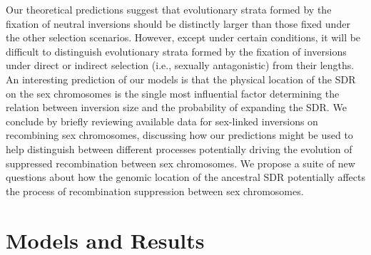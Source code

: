 \documentclass{article}
\begin{document}
Our theoretical predictions suggest that evolutionary strata formed by the fixation of neutral inversions should be distinctly larger than those fixed under the other selection scenarios. However, except under certain conditions, it will be difficult to distinguish evolutionary strata formed by the fixation of inversions under direct or indirect selection (i.e., sexually antagonistic) from their lengths. An interesting prediction of our models is that the physical location of the SDR on the sex chromosomes is the single most influential factor determining the relation between inversion size and the probability of expanding the SDR. We conclude by briefly reviewing available data for sex-linked inversions on recombining sex chromosomes, discussing how our predictions might be used to help distinguish between different processes potentially driving the evolution of suppressed recombination between sex chromosomes. We propose a suite of new questions about how the genomic location of the ancestral SDR potentially affects the process of recombination suppression between sex chromosomes.



\section*{Models and Results} \label{sec:Models}

\end{document}
